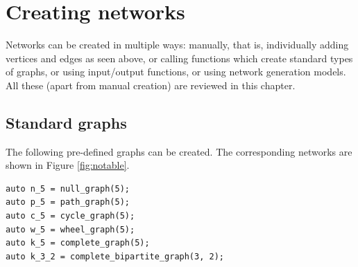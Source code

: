 \chapter{Creating networks}

Networks can be created in multiple ways: manually, that is, individually adding vertices and edges as seen above, or calling functions which create standard types of graphs, or using input/output functions, or using network generation models. All these (apart from manual creation) are reviewed in this chapter.

\section{Standard graphs}

The following pre-defined graphs can be created. The corresponding networks are shown in Figure \ref{fig:notable}.
\begin{lstlisting}[style=c++] 
auto n_5 = null_graph(5);
auto p_5 = path_graph(5);
auto c_5 = cycle_graph(5);
auto w_5 = wheel_graph(5);
auto k_5 = complete_graph(5);
auto k_3_2 = complete_bipartite_graph(3, 2);
\end{lstlisting}

